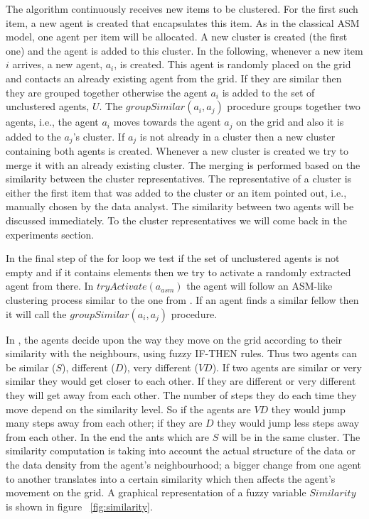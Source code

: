 The algorithm continuously receives new items to be clustered. For the first such item, a new agent is created that encapsulates this item. As in the classical ASM model, one agent per item will be allocated. A new cluster is created (the first one) and the agent is added to this cluster. In the following, whenever a new item $i$ arrives, a new agent, $a_i$, is created. This agent is randomly placed on the grid and contacts an already existing agent from the grid. If they are similar then they are grouped together otherwise the agent $a_i$ is added to the set of unclustered agents, $U$. The $groupSimilar(a_i, a_j)$ procedure groups together two agents, i.e., the agent $a_i$ moves towards the agent $a_j$ on the grid and also it is added to the $a_j$'s cluster. If $a_j$ is not already in a cluster then a new cluster containing both agents is created. Whenever a new cluster is created we try to merge it with an already existing cluster. The merging is performed based on the similarity between the cluster representatives. The representative of a cluster is either the first item that was added to the cluster or an item pointed out, i.e., manually chosen by the data analyst. The similarity between two agents will be discussed immediately. To the cluster representatives we will come back in the experiments section.

In the final step of the for loop we test if the set of unclustered agents is not empty and if it contains elements then we try to activate a randomly extracted agent from there. In $tryActivate(a_{asm})$ the agent will follow an ASM-like clustering process similar to the one from \cite{Gaceanu11AContext}. If an agent finds a similar fellow then it will call the $groupSimilar(a_i, a_j)$ procedure.

In \cite{Gaceanu11AContext}, the agents decide upon the way they move on the grid according to their similarity with the neighbours, using fuzzy IF-THEN rules. Thus two agents can be similar ($S$), different ($D$), very different ($VD$). If two agents are similar or very similar they would get closer to each other. If they are different or very different they will get away from each other. The number of steps they do each time they move depend on the similarity level. So if the agents are $VD$ they would jump many steps away from each other; if they are $D$ they would jump less steps away from each other. In the end the ants which are $S$ will be in the same cluster. 
The similarity computation is taking into account the actual structure of the data or the data density from the agent's neighbourhood; a bigger change from one agent to another translates into a certain similarity which then affects the agent's movement on the grid. A graphical representation of a fuzzy variable $Similarity$ is shown in figure ~\ref{fig:similarity}.

